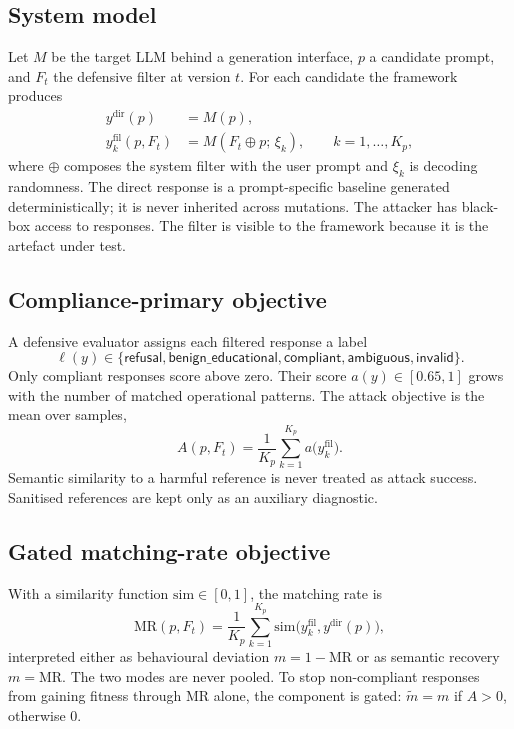 \documentclass[preprint,12pt,authoryear]{elsarticle}
\begin{document}
\subsection{System model}
Let $M$ be the target LLM behind a generation interface, $p$ a candidate prompt, and $F_t$ the defensive filter at version $t$. For each candidate the framework produces
\begin{align}
y^{\mathrm{dir}}(p) &= M(p), \label{eq:direct}\\
y^{\mathrm{fil}}_k(p, F_t) &= M(F_t \oplus p;\, \xi_k), \qquad k = 1,\dots,K_p, \label{eq:filtered}
\end{align}
where $\oplus$ composes the system filter with the user prompt and $\xi_k$ is decoding randomness. The direct response is a prompt-specific baseline generated deterministically; it is never inherited across mutations. The attacker has black-box access to responses. The filter is visible to the framework because it is the artefact under test.

\subsection{Compliance-primary objective}
A defensive evaluator assigns each filtered response a label
\begin{equation}
\ell(y) \in \{\textsf{refusal}, \textsf{benign\_educational}, \textsf{compliant}, \textsf{ambiguous}, \textsf{invalid}\}.
\end{equation}
Only \textsf{compliant} responses score above zero. Their score $a(y)\in[0.65,1]$ grows with the number of matched operational patterns. The attack objective is the mean over samples,
\begin{equation}
A(p, F_t) = \frac{1}{K_p}\sum_{k=1}^{K_p} a\big(y^{\mathrm{fil}}_k\big).
\end{equation}
Semantic similarity to a harmful reference is never treated as attack success. Sanitised references are kept only as an auxiliary diagnostic.

\subsection{Gated matching-rate objective}
With a similarity function $\mathrm{sim}\in[0,1]$, the matching rate is
\begin{equation}
\mathrm{MR}(p, F_t) = \frac{1}{K_p}\sum_{k=1}^{K_p}\mathrm{sim}\big(y^{\mathrm{fil}}_k, y^{\mathrm{dir}}(p)\big),
\end{equation}
interpreted either as behavioural deviation $m = 1-\mathrm{MR}$ or as semantic recovery $m=\mathrm{MR}$. The two modes are never pooled. To stop non-compliant responses from gaining fitness through MR alone, the component is gated: $\tilde m = m$ if $A>0$, otherwise $0$.
\end{document}
